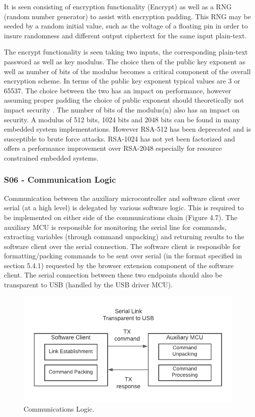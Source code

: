 It is seen consisting of encryption functionality (Encrypt) as well as a RNG (random number generator) to assist with encryption padding. This RNG may be seeded by a random initial value, such as the voltage of a floating pin in order to insure randomness and different output ciphertext for the same input plain-text.

The encrypt functionality is seen taking two inputs, the corresponding plain-text password as well as key modulus. The choice then of the public key exponent as well as number of bits of the modulus becomes a critical component of the overall encryption scheme. In terms of the public key exponent typical values are 3 or 65537. The choice between the two has an impact on performance, however assuming proper padding the choice of public exponent should theoretically not impact security \cite{exponent}. The number of bits of the modulus(n) also has an impact on security. A modulus of 512 bits, 1024 bits and 2048 bits can be found in many embedded system implementations. However RSA-512 has been deprecated and is susceptible to brute force attacks. RSA-1024 has not yet been factorized \cite{fact2} and offers a performance improvement over RSA-2048 especially for resource constrained embedded systems.

\subsubsection{S06 - Communication Logic}
Communication between the auxiliary microcontroller and software client over serial (at a high level) is delegated by various software logic. This is required to be implemented on either side of the communications chain (Figure 4.7). The auxiliary MCU is responsible for monitoring the serial line for commands, extracting variables (through command unpacking) and returning results to the software client over the serial connection. The software client is responsible for formatting/packing commands to be sent over serial (in the format specified in section 5.4.1) requested by the browser extension component of the software client. The serial connection between these two endpoints should also be transparent to USB (handled by the USB driver MCU).
\begin{figure}[H]
\centering
\includegraphics[width=0.7\columnwidth]{Figures/Fig_75.png}
\caption{Communications Logic.}
\label{fig:gantt}
\end{figure}
 
